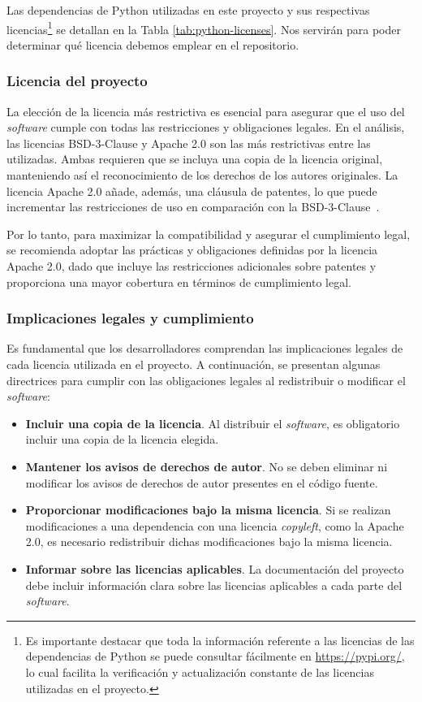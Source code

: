 Las dependencias de Python utilizadas en este proyecto y sus respectivas licencias\footnote{Es importante destacar que toda la información referente a las licencias de las dependencias de Python se puede consultar fácilmente en \url{https://pypi.org/}, lo cual facilita la verificación y actualización constante de las licencias utilizadas en el proyecto.} se detallan en la Tabla \ref{tab:python-licenses}. Nos servirán para poder determinar qué licencia debemos emplear en el repositorio.

\subsubsection{Licencia del proyecto}

La elección de la licencia más restrictiva es esencial para asegurar que el uso del \textit{software} cumple con todas las restricciones y obligaciones legales. En el análisis, las licencias BSD-3-Clause y Apache 2.0 son las más restrictivas entre las utilizadas. Ambas requieren que se incluya una copia de la licencia original, manteniendo así el reconocimiento de los derechos de los autores originales. La licencia Apache 2.0 añade, además, una cláusula de patentes, lo que puede incrementar las restricciones de uso en comparación con la BSD-3-Clause~\cite{licencia1,licencia2}.

Por lo tanto, para maximizar la compatibilidad y asegurar el cumplimiento legal, se recomienda adoptar las prácticas y obligaciones definidas por la licencia Apache 2.0, dado que incluye las restricciones adicionales sobre patentes y proporciona una mayor cobertura en términos de cumplimiento legal.

\subsubsection{Implicaciones legales y cumplimiento}

Es fundamental que los desarrolladores comprendan las implicaciones legales de cada licencia utilizada en el proyecto. A continuación, se presentan algunas directrices para cumplir con las obligaciones legales al redistribuir o modificar el \textit{software}:

\begin{itemize}
    \item \textbf{Incluir una copia de la licencia}. Al distribuir el \textit{software}, es obligatorio incluir una copia de la licencia elegida.
    \item \textbf{Mantener los avisos de derechos de autor}. No se deben eliminar ni modificar los avisos de derechos de autor presentes en el código fuente.
    \item \textbf{Proporcionar modificaciones bajo la misma licencia}. Si se realizan modificaciones a una dependencia con una licencia \textit{copyleft}, como la Apache 2.0, es necesario redistribuir dichas modificaciones bajo la misma licencia.
    \item \textbf{Informar sobre las licencias aplicables}. La documentación del proyecto debe incluir información clara sobre las licencias aplicables a cada parte del \textit{software}.
\end{itemize}

